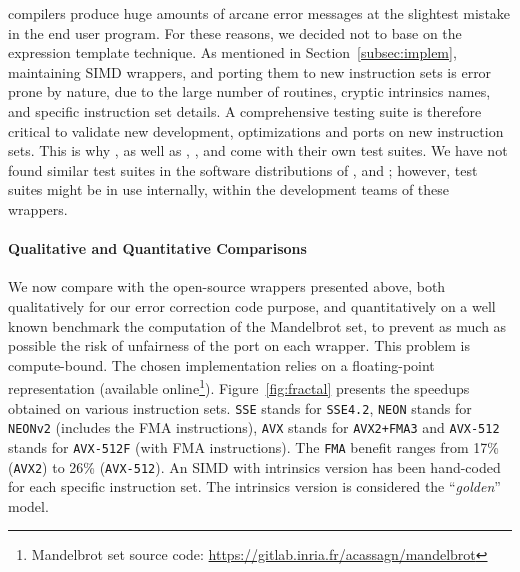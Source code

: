 compilers produce huge amounts of arcane error messages at the slightest mistake
in the end user program. For these reasons, we decided not to base \MIPP on the
expression template technique. As mentioned in Section~\ref{subsec:implem},
maintaining SIMD wrappers, and porting them to new instruction sets is error
prone by nature, due to the large number of routines, cryptic intrinsics names,
and specific instruction set details. A comprehensive testing suite is therefore
critical to validate new development, optimizations and ports on new instruction
sets. This is why \MIPP, as well as \Vc, \BoostSIMD, \simdpp and \bSIMD come
with their own test suites. We have not found similar test suites in the
software distributions of \VCL, \xsimd and \TSIMD; however, test suites might be
in use internally, within the development teams of these wrappers.

\paragraph{Qualitative and Quantitative Comparisons}

We now compare \MIPP with the open-source wrappers presented above, both
qualitatively for our error correction code purpose, and quantitatively on a
well known benchmark the computation of the Mandelbrot set, to prevent as much
as possible the risk of unfairness of the port on each wrapper. This problem is
compute-bound. The chosen implementation relies on a floating-point
representation (available online\footnote{Mandelbrot set source code:
\url{https://gitlab.inria.fr/acassagn/mandelbrot}}). Figure~\ref{fig:fractal}
presents the speedups obtained on various instruction sets. \verb|SSE| stands
for \verb|SSE4.2|, \verb|NEON| stands for \verb|NEONv2| (includes the FMA
instructions), \verb|AVX| stands for \verb|AVX2+FMA3| and \verb|AVX-512| stands
for \verb|AVX-512F| (with FMA instructions). The \verb|FMA| benefit ranges from
17\% (\verb|AVX2|) to 26\% (\verb|AVX-512|). An SIMD with intrinsics version has
been hand-coded for each specific instruction set. The intrinsics version is
considered the ``\emph{golden}'' model.

